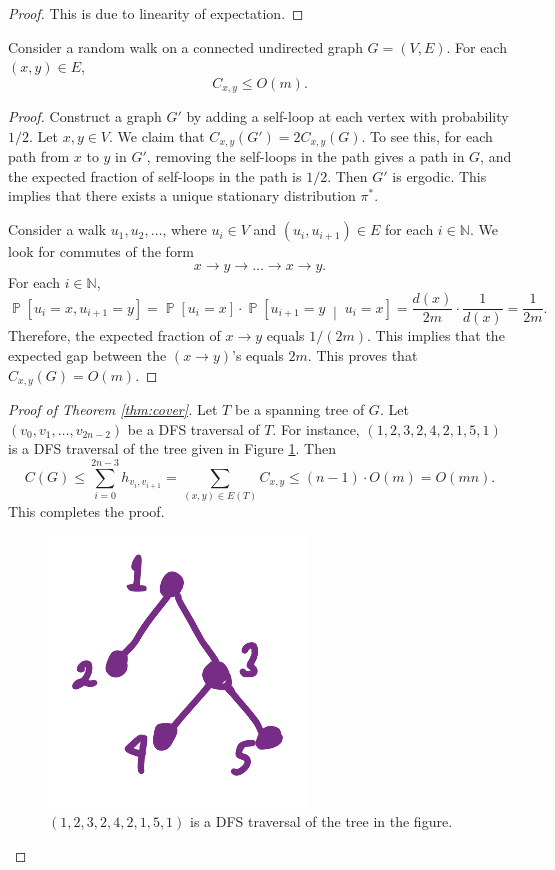 \documentclass[letterpaper, reqno,11pt]{article}
\newcommand{\NN}{\mathbb{N}}
\newcommand{\PP}{\mathop{{}\mathbb{P}}}
\begin{document}
\begin{proof}
  This is due to linearity of expectation.
\end{proof}

\begin{lemma}
  Consider a random walk on a connected undirected graph $G = (V, E)$. For each $(x, y) \in E$,
  $$ C_{x, y} \leq O(m). $$
\end{lemma}

\begin{proof}
  Construct a graph $G'$ by adding a self-loop at each vertex with probability $1/2$. Let $x, y \in V$. We claim that $C_{x, y}(G') = 2C_{x, y}(G)$. To see this, for each path from $x$ to $y$ in $G'$, removing the self-loops in the path gives a path in $G$, and the expected fraction of self-loops in the path is $1/2$. Then $G'$ is ergodic. This implies that there exists a unique stationary distribution $\pi^*$.

  Consider a walk $u_1, u_2, \ldots$, where $u_i \in V$ and $(u_i, u_{i + 1}) \in E$ for each $i \in \NN$. We look for commutes of the form
  $$ x \to y \to \ldots \to x \to y. $$
  For each $i \in \NN$,
  $$ \PP\left[u_i = x, u_{i + 1} = y\right] = \PP\left[u_i = x\right] \cdot \PP\left[u_{i + 1} = y \;\middle|\; u_i = x\right] = \frac{d(x)}{2m} \cdot \frac{1}{d(x)} = \frac{1}{2m}. $$
  Therefore, the expected fraction of $x \to y$ equals $1/(2m)$. This implies that the expected gap between the $(x \to y)$'s equals $2m$. This proves that $C_{x, y}(G) = O(m)$.
\end{proof}

\begin{proof}[Proof of Theorem \ref{thm:cover}]
  Let $T$ be a spanning tree of $G$. Let $(v_0, v_1, \ldots, v_{2n - 2})$ be a DFS traversal of $T$. For instance, $(1, 2, 3, 2, 4, 2, 1, 5, 1)$ is a DFS traversal of the tree given in Figure \ref{fig:dfs}. Then
  $$ C(G) \leq \sum_{i = 0}^{2n - 3} h_{v_i, v_{i + 1}} = \sum_{(x, y) \in E(T)} C_{x, y} \leq (n - 1) \cdot O(m) = O(mn). $$
  This completes the proof.

  \begin{figure}[h]
    \centering
    \includegraphics[width=.3\textwidth]{figures/dfs.png}
    \caption{$(1, 2, 3, 2, 4, 2, 1, 5, 1)$ is a DFS traversal of the tree in the figure.}
    \label{fig:dfs}
  \end{figure}
\end{proof}
\end{document}
